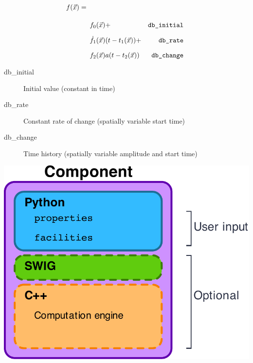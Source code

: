 \documentclass[pdftex,cig,slideColor]{pp4slides}
\begin{document}
  
  \begin{equation*}
    \begin{split}
      f(\vec{x}) =& \\[10pt]
      & \begin{array}{lr}
        f_{0}(\vec{x}) + & \textrm{{\tt db\_initial}}\\[10pt]
        \dot{f}_{1}(\vec{x}) (t-t_{1}(\vec{x})) + & \textrm{{\tt db\_rate}}\\[10pt]
        f_{2}(\vec{x})a(t-t_{2}(\vec{x})) & \textrm{{\tt db\_change}}
      \end{array}
    \end{split}
  \end{equation*}
  \vfill
  \begin{description}
  \item[db\_initial] Initial value (constant in time)
  \item[db\_rate] Constant rate of change (spatially variable start time)
  \item[db\_change] Time history (spatially variable amplitude and
    start time)
  \end{description}
 

  \vfill
  \begin{center}
    \includegraphics[scale=1.0]{figs/component}
  \end{center}  
  \vfill
\end{document}
